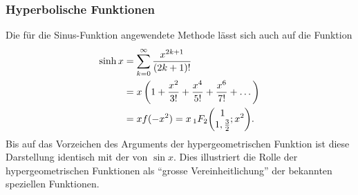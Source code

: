 \subsubsection{Hyperbolische Funktionen}
Die für die Sinus-Funktion angewendete Methode lässt sich auch
auf die Funktion 
\begin{align*}
\sinh x
&=
\sum_{k=0}^\infty \frac{x^{2k+1}}{(2k+1)!}
\\
&=
x
\,
\biggl(
1+\frac{x^2}{3!} + \frac{x^4}{5!}+\frac{x^6}{7!}+\dots
\biggr)
\\
&=
xf(-x^2)
=
x\,\mathstrut_1F_2\biggl(
\begin{matrix}1\\1,\frac{3}{2}\end{matrix}
;x^2
\biggr).
\end{align*}
Bis auf das Vorzeichen des Arguments der hypergeometrischen Funktion
ist diese Darstellung identisch mit der von $\sin x$.
Dies illustriert die Rolle der hypergeometrischen Funktionen als
``grosse Vereinheitlichung'' der bekannten speziellen Funktionen.


